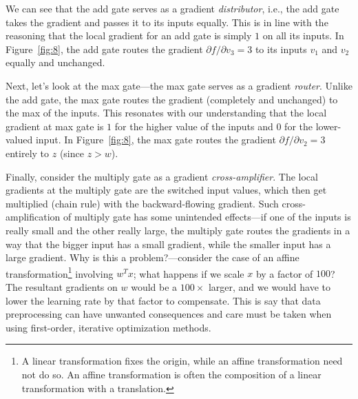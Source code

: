 We can see that the add gate serves as a gradient \textit{distributor}, i.e., the add gate takes the gradient and passes it to its inputs equally. This is in line with the reasoning that the local gradient for an add gate is simply $1$ on all its inputs. In Figure~\ref{fig:8}, the add gate routes the gradient $\partial f / \partial v_3 = 3$ to its inputs $v_1$ and $v_2$ equally and unchanged.

Next, let's look at the max gate---the max gate serves as a gradient \textit{router}. Unlike the add gate, the max gate routes the gradient (completely and unchanged) to the max of the inputs. This resonates with our understanding that the local gradient at max gate is $1$ for the higher value of the inputs and $0$ for the lower-valued input. In Figure~\ref{fig:8}, the max gate routes the gradient $\partial f / \partial v_2 = 3$ entirely to $z$ (since $z > w$).

Finally, consider the multiply gate as a gradient \textit{cross-amplifier}. The local gradients at the multiply gate are the switched input values, which then get multiplied (chain rule) with the backward-flowing gradient. Such cross-amplification of multiply gate has some unintended effects---if one of the inputs is really small and the other really large, the multiply gate routes the gradients in a way that the bigger input has a small gradient, while the smaller input has a large gradient. Why is this a problem?---consider the case of an affine transformation\footnote{A linear transformation fixes the origin, while an affine transformation need not do so. An affine transformation is often the composition of a linear transformation with a translation.} involving $w^Tx$; what happens if we scale $x$ by a factor of $100$? The resultant gradients on $w$ would be a $100\times$ larger, and we would have to lower the learning rate by that factor to compensate. This is say that data preprocessing can have unwanted consequences and care must be taken when using first-order, iterative optimization methods.
